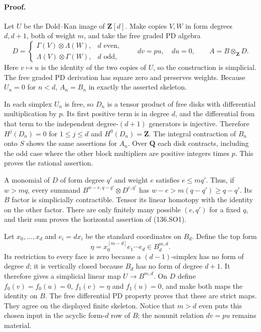 \paragraph{Proof.}
Let $U$ be the Dold--Kan image of $\mathbf Z[d]$.  Make copies
$V,W$ in form degrees $d,d+1$, both of weight $m$, and take the
free graded PD algebra
\[
 D=\begin{cases}
       \Gamma(V)\otimes\Lambda(W),&d\text{ even},\\
       \Lambda(V)\otimes\Gamma(W),&d\text{ odd},
    \end{cases}
 \qquad dv=p u,\quad du=0,
 \qquad A=B\otimes_{\mathbf Z}D.                         \tag{136.SO3}
\]
Here $v\mapsto u$ is the identity of the two copies of $U$, so
the construction is simplicial.  The free graded PD derivation
has square zero and preserves weights.  Because $U_n=0$ for $n<d$,
$A_n=B_n$ in exactly the asserted skeleton.

In each simplex $U_n$ is free, so $D_n$ is a tensor product of
free disks with differential multiplication by $p$.  Its first
positive term is in degree $d$, and the differential from that
term to the independent degree-$(d+1)$ generators is injective.
Therefore $H^j(D_n)=0$ for $1\leq j\leq d$ and $H^0(D_n)=\mathbf Z$.
The integral contraction of $B_n$ onto $S$ shows the same assertions
for $A_n$.  Over $\mathbf Q$ each disk contracts, including the
odd case where the other block multipliers are positive integers
times $p$.  This proves the rational assertion.

A monomial of $D$ of form degree $q'$ and weight $e$ satisfies
$e\leq m q'$.  Thus, if $w>mq$, every summand
$B^{w-e,q-q'}\otimes D^{e,q'}$ has
$w-e>m(q-q')\geq q-q'$.  Its $B$ factor is simplicially
contractible.  Tensor its linear homotopy with the identity on
the other factor.  There are only finitely many possible $(e,q')$
for a fixed $q$, and their sum proves the horizontal assertion
of (136.SO1).

Let $x_0,\ldots,x_d$ and $e_i=dx_i$ be the standard coordinates
on $B_d$.  Define the top form
\[
                 \eta=x_0^{[m-d]}e_1\cdots e_d
                          \in B_d^{m,d}.                 \tag{136.SO4}
\]
Its restriction to every face is zero because a $(d-1)$-simplex
has no form of degree $d$; it is vertically closed because $B_d$
has no form of degree $d+1$.  It therefore gives a simplicial
linear map $U\to B^{m,d}$.  On $D$ define $f_0(v)=f_0(u)=0$,
$f_1(v)=\eta$ and $f_1(u)=0$, and make both maps the identity
on $B$.  The free differential PD property proves that these
are strict maps.  They agree on the displayed finite skeleton.
Notice that $m>d$ even puts this chosen input in the acyclic
form-$d$ row of $B$; the nonunit relation $dv=pu$ remains material.

